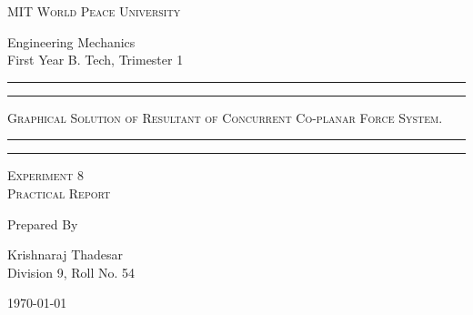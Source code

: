 \documentclass[11pt]{article}
\begin{document}
	
	\begin{titlepage} 
		\centering 
		
		
		\huge\textsc{
			MIT World Peace University
		}\\
	
		\vspace{0.75\baselineskip} %
		
		\LARGE{
			Engineering Mechanics\\
			First Year B. Tech, Trimester 1
		}
		
		\vfill %
		
		
		\rule{\textwidth}{1.6pt}\vspace*{-\baselineskip}\vspace*{2pt}
		\rule{\textwidth}{0.6pt}
		\vspace{0.75\baselineskip} %
		
		
		
		\huge{\textsc{
				Graphical Solution of Resultant of Concurrent Co-planar Force System. 
			}} \\
		
		
		
		\vspace{0.5\baselineskip} %
		\rule{\textwidth}{0.6pt}\vspace*{-\baselineskip}\vspace*{2.8pt}
		\rule{\textwidth}{1.6pt}
		
		\vspace{1\baselineskip} %

			
		\LARGE\textsc{
			\centering
			Experiment 8\\
			Practical Report
		} %
		\vfill
		
		
		Prepared By
		\vspace{0.5\baselineskip} %
		
		\Large{
			Krishnaraj Thadesar \\
			Division 9, Roll No. 54
		}
		
		
		\vspace{0.5\baselineskip} %
		\today

	\end{titlepage}
	
\end{document}
